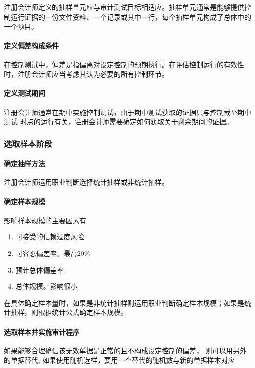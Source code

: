 \documentclass[UTF8,12pt]{ctexart}
\numberwithin{equation}{section} %
\numberwithin{figure}{section}
\numberwithin{table}{section}
\begin{document}
	注册会计师定义的抽样单元应与审计测试目标相适应。抽样单元通常是能够提供控制运行证据的一份文件资料、一个记录或其中一行，每个抽样单元构成了总体中的一个项目。
	
	\paragraph{定义偏差构成条件} 在控制测试中，偏差是指偏离对设定控制的预期执行。在评估控制运行的有效性时，注册会计师应当考虑其认为必要的所有控制环节。
	
	\paragraph{定义测试期间} 注册会计师通常在期中实施控制测试，由于期中测试获取的证据只与控制截至期中测试 时点的运行有关，注册会计师需要确定如何获取关于剩余期间的证据。
	
	\subsubsection{选取样本阶段}
	\paragraph{确定抽样方法} 注册会计师运用职业判断选择统计抽样或非统计抽样。
	
	\paragraph{确定样本规模} 影响样本规模的主要因素有
	\begin{enumerate}
		\item 可接受的信赖过度风险
		
		\item 可容忍偏差率。最高20\%
		
		\item 预计总体偏差率
		
		\item 总体规模。影响很小
	\end{enumerate}
	
	在具体确定样本量时，如果是非统计抽样则运用职业判断确定样本规模；如果是统计抽样，则根据统计公式确定样本规模。
	
	\paragraph{选取样本并实施审计程序} 如果能够合理确信该无效单据是正常的且不构成设定控制的偏差， 则可以用另外的单据替代; 如果使用随机选样，要用一个替代的随机数与新的单据样本对应
	
\end{document}
